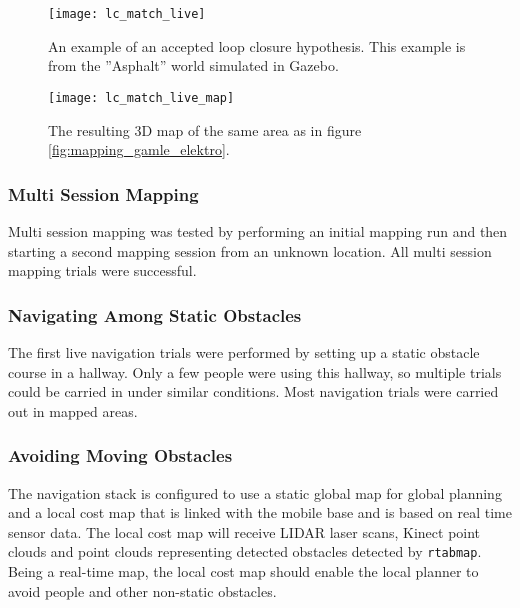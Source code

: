 \begin{figure}[h]
	\centering
	\texttt{[image: lc\_match\_live]}
	\caption{An example of an accepted loop closure hypothesis. This example is from the ''Asphalt'' world simulated in Gazebo.}
	\label{fig:lc_match_live}
\end{figure}

\begin{figure}[p]
	\centering
	\texttt{[image: lc\_match\_live\_map]}
	\caption{The resulting 3D map of the same area as in figure \ref{fig:mapping_gamle_elektro}.}
	\label{fig:lc_match_live_map}
\end{figure}

\subsubsection{Multi Session Mapping}

Multi session mapping was tested by performing an initial mapping run and then starting a second mapping session from an unknown location. All multi session mapping trials were successful.

\subsubsection{Navigating Among Static Obstacles}

The first live navigation trials were performed by setting up a static obstacle course in a hallway. Only a few people were using this hallway, so multiple trials could be carried in under similar conditions. Most navigation trials were carried out in mapped areas.



\subsubsection{Avoiding Moving Obstacles}

The navigation stack is configured to use a static global map for global planning and a local cost map that is linked with the mobile base and is based on real time sensor data. The local cost map will receive LIDAR laser scans, Kinect point clouds and point clouds representing detected obstacles detected by \texttt{rtabmap}. Being a real-time map, the local cost map should enable the local planner to avoid people and other non-static obstacles.


